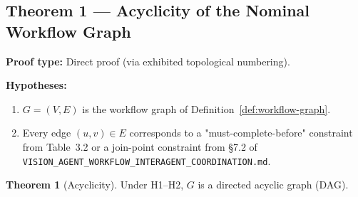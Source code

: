 \documentclass[12pt]{article}
\theoremstyle{definition}
\newtheorem{theorem}{Theorem}
\newcommand{\code}[1]{\texttt{#1}}
\newcommand{\VisionFlow}{\code{VISION\_AGENT\_\allowbreak WORKFLOW\_\allowbreak INTERAGENT\_\allowbreak COORDINATION.md}}
\begin{document}
\subsection{Theorem 1 --- Acyclicity of the Nominal Workflow Graph}

\textbf{Proof type:} Direct proof (via exhibited topological numbering).

\textbf{Hypotheses:}
\begin{enumerate}
    \item[H1] $G = (V,E)$ is the workflow graph of Definition~\ref{def:workflow-graph}.
    \item[H2] Every edge $(u,v) \in E$ corresponds to a "must-complete-before"
              constraint from Table~3.2 or a join-point constraint from
              \S7.2 of \VisionFlow{}.
\end{enumerate}

\begin{theorem}[Acyclicity]
\label{thm:acyclic}
Under H1--H2, $G$ is a directed acyclic graph (DAG).
\end{theorem}
\end{document}
